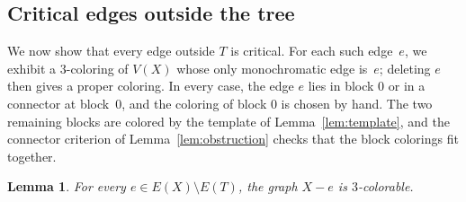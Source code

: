 \documentclass[11pt,letterpaper]{article}
\numberwithin{equation}{section}
\theoremstyle{plain}
\newtheorem{lemma}[theorem]{Lemma}
\theoremstyle{definition}
\theoremstyle{remark}
\begin{document}
\subsection{Critical edges outside the tree}\label{sec:critical}

We now show that every edge outside $T$ is critical. For each such edge~$e$, we exhibit a $3$-coloring of $V(X)$ whose only monochromatic edge is~$e$; deleting $e$ then gives a proper coloring. In every case, the edge $e$ lies in block $0$ or in a connector at block~$0$, and the coloring of block $0$ is chosen by hand. The two remaining blocks are colored by the template of Lemma~\ref{lem:template}, and the connector criterion of Lemma~\ref{lem:obstruction} checks that the block colorings fit together.

\begin{lemma}\label{lem:critical}
For every $e\in E(X)\setminus E(T)$, the graph $X-e$ is $3$-colorable.
\end{lemma}
\end{document}

